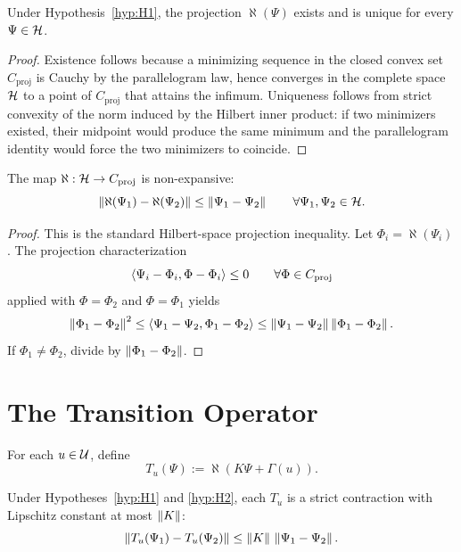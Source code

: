 \begin{theorem}\label{thm:projection}
Under Hypothesis~\ref{hyp:H1}, the projection $\aleph(\Psi)$ exists and is unique for every $\Psi\in\mathcal{H}$.
\end{theorem}

\begin{proof}
Existence follows because a minimizing sequence in the closed convex set ${C_{\mathrm{proj}}}$ is Cauchy by the parallelogram law, hence converges in the complete space $\mathcal{H}$ to a point of ${C_{\mathrm{proj}}}$ that attains the infimum. Uniqueness follows from strict convexity of the norm induced by the Hilbert inner product: if two minimizers existed, their midpoint would produce the same minimum and the parallelogram identity would force the two minimizers to coincide.
\end{proof}

\begin{lemma}\label{lem:nonexp}
The map $\aleph:\mathcal{H}\to{C_{\mathrm{proj}}}$ is non-expansive:
\[
\left\lVert \aleph(\Psi_1)-\aleph(\Psi_2) \right\rVert\le \left\lVert \Psi_1-\Psi_2 \right\rVert
\qquad
\forall \Psi_1,\Psi_2\in\mathcal{H}.
\]
\end{lemma}

\begin{proof}
This is the standard Hilbert-space projection inequality. Let $\Phi_i=\aleph(\Psi_i)$. The projection characterization
\[
\left\langle \Psi_i-\Phi_i, \Phi-\Phi_i \right\rangle\le 0
\qquad
\forall \Phi\in{C_{\mathrm{proj}}}
\]
applied with $\Phi=\Phi_2$ and $\Phi=\Phi_1$ yields
\[
\left\lVert \Phi_1-\Phi_2 \right\rVert^2
\le
\left\langle \Psi_1-\Psi_2, \Phi_1-\Phi_2 \right\rangle
\le
\left\lVert \Psi_1-\Psi_2 \right\rVert\left\lVert \Phi_1-\Phi_2 \right\rVert.
\]
If $\Phi_1\neq \Phi_2$, divide by $\left\lVert \Phi_1-\Phi_2 \right\rVert$.
\end{proof}

\section{The Transition Operator}

\begin{definition}\label{def:transition}
For each $u\in\mathcal{U}$, define
\[
T_u(\Psi):=\aleph(K\Psi+\Gamma(u)).
\]
\end{definition}

\begin{theorem}[Contractivity]\label{thm:contraction}
Under Hypotheses~\ref{hyp:H1} and \ref{hyp:H2}, each $T_u$ is a strict contraction with Lipschitz constant at most $\left\lVert K \right\rVert$:
\[
\left\lVert T_u(\Psi_1)-T_u(\Psi_2) \right\rVert\le \left\lVert K \right\rVert\,\left\lVert \Psi_1-\Psi_2 \right\rVert.
\]
\end{theorem}

